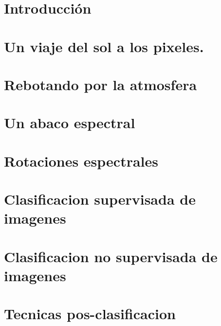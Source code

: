 \documentclass[a4paper]{article}
\begin{document}
\section*{Introducción}
\label{sec:intro}
\newpage 
\section{Un viaje del sol a los pixeles.}
\label{viaje}


\section{Rebotando por la atmosfera}
\label{rebotando}


\section{Un abaco espectral}
\label{abaco}


\section{Rotaciones espectrales}
\label{rotaciones}


\section{Clasificacion supervisada de imagenes}
\label{educando}


\section{Clasificacion no supervisada de imagenes}
\label{otrolado}


\section{Tecnicas pos-clasificacion}
\label{pos}

\end{document}
